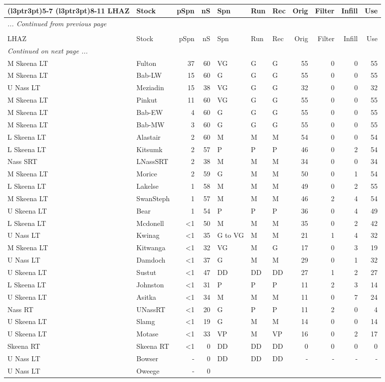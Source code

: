 \documentclass[french,11pt]{book}
\begin{document}
\begin{longtable}[t]{llrrlllrrrr}
\cmidrule(l{3pt}r{3pt}){5-7} \cmidrule(l{3pt}r{3pt}){8-11} LHAZ & Stock & pSpn & nS & Spn & Run & Rec & Orig & Filter & Infill & Use\\ \midrule \endfirsthead \multicolumn{11}{l}{\textit{... Continued from previous page}} \\ \hline \caption*{}\\ \toprule LHAZ & Stock & pSpn & nS & Spn & Run & Rec & Orig & Filter & Infill & Use\\ \midrule \endhead \hline \multicolumn{11}{l}{\textit{Continued on next page ...}} \\ \endfoot \bottomrule \endlastfoot M Skeena LT & Fulton & 37 & 60 & VG & G & G & 55 & 0 & 0 & 55\\ M Skeena LT & Bab-LW & 15 & 60 & G & G & G & 55 & 0 & 0 & 55\\ U Nass LT & Meziadin & 15 & 38 & VG & G & G & 32 & 0 & 0 & 32\\ M Skeena LT & Pinkut & 11 & 60 & VG & G & G & 55 & 0 & 0 & 55\\ M Skeena LT & Bab-EW & 4 & 60 & G & G & G & 55 & 0 & 0 & 55\\ M Skeena LT & Bab-MW & 3 & 60 & G & G & G & 55 & 0 & 0 & 55\\ L Skeena LT & Alastair & 2 & 60 & M & M & M & 54 & 0 & 0 & 54\\ L Skeena LT & Kitsumk & 2 & 57 & P & P & P & 46 & 0 & 2 & 54\\ Nass SRT & LNassSRT & 2 & 38 & M & M & M & 34 & 0 & 0 & 34\\ M Skeena LT & Morice & 2 & 59 & G & M & M & 50 & 0 & 1 & 54\\ L Skeena LT & Lakelse & 1 & 58 & M & M & M & 49 & 0 & 2 & 55\\ M Skeena LT & SwanSteph & 1 & 57 & M & M & M & 46 & 2 & 4 & 54\\ U Skeena LT & Bear & 1 & 54 & P & P & P & 36 & 0 & 4 & 49\\ L Skeena LT & Mcdonell & <1 & 50 & M & M & M & 35 & 0 & 2 & 42\\ U Nass LT & Kwinag & <1 & 35 & G to VG & M & M & 21 & 1 & 4 & 32\\ M Skeena LT & Kitwanga & <1 & 32 & VG & M & G & 17 & 0 & 3 & 19\\ U Nass LT & Damdoch & <1 & 37 & G & M & M & 29 & 0 & 1 & 32\\ U Skeena LT & Sustut & <1 & 47 & DD & DD & DD & 27 & 1 & 2 & 27\\ L Skeena LT & Johnston & <1 & 31 & P & P & P & 11 & 2 & 3 & 14\\ U Skeena LT & Asitka & <1 & 34 & M & M & M & 11 & 0 & 7 & 24\\ Nass RT & UNassRT & <1 & 20 & G & P & P & 11 & 2 & 0 & 4\\ U Skeena LT & Slamg & <1 & 19 & G & M & M & 14 & 0 & 0 & 14\\ U Skeena LT & Motase & <1 & 33 & VP & M & VP & 16 & 0 & 2 & 17\\ Skeena RT & Skeena RT & <1 & 0 & DD & DD & DD & 0 & 0 & 0 & 0\\ U Nass LT & Bowser & - & 0 & DD & DD & DD & - & - & - & -\\ U Nass LT & Oweege & - & 0 
\end{longtable}
\end{document}
